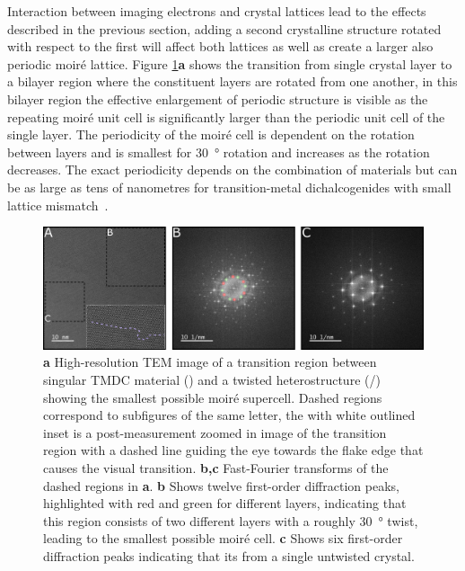 Interaction between imaging electrons and crystal lattices lead to the effects described in the previous section, adding a second crystalline structure rotated with respect to the first will affect both lattices as well as create a larger also periodic moiré lattice.
Figure \ref{fig:moire_trans}\textbf{a} shows the transition from single crystal layer to a bilayer region where the constituent layers are rotated from one another, in this bilayer region the effective enlargement of periodic structure is visible as the repeating moiré unit cell is significantly larger than the periodic unit cell of the single layer. The periodicity of the moiré cell is dependent on the rotation between layers and is smallest for \SI{30}{\degree} rotation and increases as the rotation decreases. The exact periodicity depends on the combination of materials but can be as large as tens of nanometres for transition-metal dichalcogenides with small lattice mismatch~\cite{rosenbergerAtomicReconstructionMoire}.

\begin{figure}[h]
    \centering
    \includegraphics[width=1\linewidth, keepaspectratio]{resources/Figures/moire_transition.png}
    \caption{\textbf{a} High-resolution TEM image of a transition region between singular TMDC material () and a twisted heterostructure (/) showing the smallest possible moiré supercell. Dashed regions correspond to subfigures of the same letter, the with white outlined inset is a post-measurement zoomed in image of the transition region with a dashed line guiding the eye towards the flake edge that causes the visual transition. \textbf{b,c} Fast-Fourier transforms of the dashed regions in \textbf{a}. \textbf{b} Shows twelve first-order diffraction peaks, highlighted with red and green for different layers, indicating that this region consists of two different layers with a roughly \SI{30}{\degree} twist, leading to the smallest possible moiré cell. \textbf{c} Shows six first-order diffraction peaks indicating that its from a single untwisted  crystal. }
    \label{fig:moire_trans}
\end{figure}


